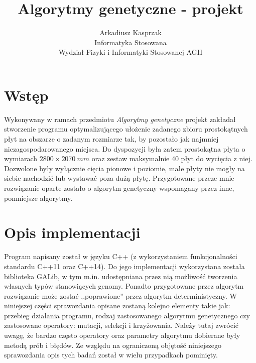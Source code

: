 \documentclass[11pt,a4paper,oneside]{article}
\title{Algorytmy genetyczne - projekt} %
\author{Arkadiusz Kasprzak\\Informatyka Stosowana\\Wydział Fizyki i Informatyki Stosowanej AGH} %
\date{}
\begin{document}
\maketitle

\tableofcontents
\newpage

\pagestyle{fancy}
\fancyhf{}

\cfoot{\thepage}

\section{Wstęp}
Wykonywany w ramach przedmiotu \textit{Algorytmy genetyczne} projekt zakładał stworzenie programu optymalizującego ułożenie zadanego zbioru prostokątnych płyt na obszarze o zadanym rozmiarze tak, by pozostało jak najmniej niezagospodarowanego miejsca. Do dyspozycji była zatem prostokątna płyta o wymiarach $2800 \times 2070~\si{mm}$ oraz zestaw maksymalnie 40 płyt do wycięcia z niej. Dozwolone były wyłącznie cięcia pionowe i poziomie, małe płyty nie mogły na siebie nachodzić lub wystawać poza dużą płytę. Przygotowane przeze mnie rozwiązanie oparte zostało o algorytm genetyczny wspomagany przez inne, pomniejsze algorytmy.

\section{Opis implementacji}
Program napisany został w języku C++ (z wykorzystaniem funkcjonalności standardu C++11 oraz C++14). Do jego implementacji wykorzystana została biblioteka GALib, w tym m.in. udostępniana przez nią możliwość tworzenia własnych typów stanowiących genomy. Ponadto przygotowane przez algorytm rozwiązanie może zostać ,,poprawione'' przez algorytm deterministyczny. W niniejszej części sprawozdania opisane zostaną kolejno elementy takie jak: przebieg działania programu, rodzaj zastosowanego algorytmu genetycznego czy zastosowane operatory: mutacji, selekcji i krzyżowania. Należy tutaj zwrócić uwagę, że bardzo często operatory oraz parametry algorytmu dobierane były metodą prób i błędów. Ze względu na ograniczoną objętość niniejszego sprawozdania opis tych badań został w wielu przypadkach pominięty.
\end{document}
